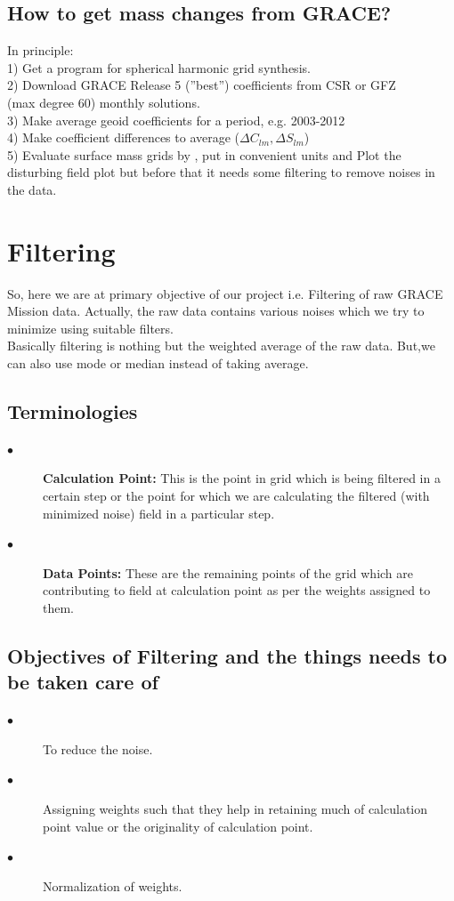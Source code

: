 \documentclass[a4paper,12pt]{report}
\begin{document}
\section{How  to get mass changes from GRACE?}
In principle:\\
1) Get a program for spherical harmonic grid synthesis.\\
2) Download GRACE Release 5 (”best”) coefficients from CSR or GFZ \\(max degree 60) monthly solutions.\\
3) Make average geoid coefficients for a period, e.g. 2003-2012\\
4) Make coefficient differences to average ($\Delta C_{lm}, \Delta S_{lm}$)\\
5) Evaluate surface mass grids by , put in convenient units and Plot the disturbing field plot but before that it needs some filtering to remove noises in the data. \\


\chapter{Filtering}
So, here we are at primary objective of our project i.e. Filtering of raw GRACE Mission data. Actually, the raw data contains various noises which we try to minimize using suitable filters.
\\
Basically filtering is nothing but the weighted average of the raw data. But,we can also use mode or median instead of taking average. 

\section{Terminologies} 
	\begin{description}
	\item[$\bullet$]\textbf{Calculation Point: }This is the point in grid which is being filtered in a certain step or the point for which we are calculating the filtered (with minimized noise) field in a particular step.\\ 
	\item[$\bullet$]\textbf{Data Points: }These are the remaining points of the grid which are contributing to field at calculation point as per the weights assigned to them.
	\end{description}  

\section{Objectives of Filtering and the things needs to be taken care of} 
	\begin{description}
	\item[$\bullet$]To reduce the noise.
	\item[$\bullet$]Assigning weights such that they help in 		retaining much of calculation point value or the 				originality of calculation point.
	\item[$\bullet$]Normalization of weights.
	\end{description}  
 
\end{document}

